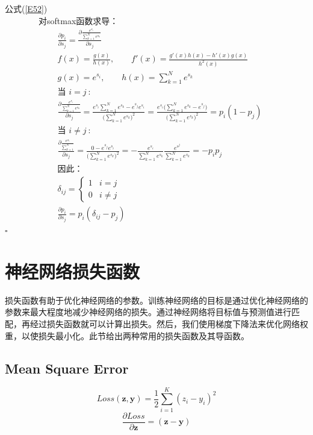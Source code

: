 \documentclass[UTF-8]{progbookcn}
\newenvironment{proof}{{\noindent\textbf{证明:}}}{\hfill $\square$\par}
\begin{document}
\begin{proof} 公式(\ref{E52})\\
\indent ~~~~~~~~对softmax函数求导：
\begin{align*}
  &\frac{\partial p_i}{\partial s_j}=\frac{\partial\frac{e^{s_i}}{\sum_{k=1}^{N}e^{s_k}}}{\partial s_j}\\
  &f(x) = \frac{g(x)}{h(x)},~~~~~~~~~f'(x)=\frac{g'(x)h(x)-h'(x)g(x)}{h^2(x)}\\
  &g(x)=e^{s_i},~~~~~~~~~h(x)=\sum_{k=1}^{N}e^{s_k}\\
  &\text{当~}i=j~:\\
  &\frac{\partial\frac{e^{s_i}}{\sum_{k=1}^{N}e^{s_k}}}{\partial s_j}=\frac{e^{s_i} \sum_{k=1}^{N} e^{s_k}-e^{s_j}e^{s_i}}{\big(\sum_{k=1}^{N}e^{s_k}\big)^2}
  =\frac{e^{s_i}\big(\sum_{k=1}^{N}e^{s_k}-e^{s_j}\big)}{\big(\sum_{k=1}^{N}e^{s_k}\big)^2}
  =p_i(1-p_j)\\
  &\text{当~}i\neq j~:\\
  &\frac{\partial\frac{e^{s_i}}{\sum_{k=1}^{N}}}{\partial s_j}=\frac{0-e^{s_j}e^{s_i}}{\big(\sum_{k=1}^{N}e^{s_k}\big)^2}
  =-\frac{e^{s_i}}{\sum_{k=1}^{N}e^{s_k}}\frac{e^{s^j}}{\sum_{k=1}^{N}e^{s_k}}
  =-p_ip_j\\
  &\text{因此：}\\
  &\delta_{ij}=
\begin{cases}
1& i=j\\
0& i\neq j
\end{cases}\\
&\frac{\partial p_i}{\partial s_j}=p_i(\delta_{ij}-p_j)
\end{align*}
\end{proof}


\section{神经网络损失函数}
损失函数有助于优化神经网络的参数。训练神经网络的目标是通过优化神经网络的参数来最大程度地减少神经网络的损失。通过神经网络将目标值与预测值进行匹配，再经过损失函数就可以计算出损失。然后，我们使用梯度下降法来优化网络权重，以使损失最小化\cite{DBLP:books/daglib/0040158}。此节给出两种常用的损失函数及其导函数。
\subsection{Mean Square Error}
\begin{equation}\label{2.2.1.1}
  Loss(\bm{z},\bm{y}) =\frac{1}{2} \sum_{i=1}^{K}(z_i-y_i)^2
\end{equation}
\begin{equation}\label{2.2.1.2}
\frac{\partial Loss}{\partial \bm{z}}  = (\bm{z}-\bm{y})
\end{equation}
\end{document}
